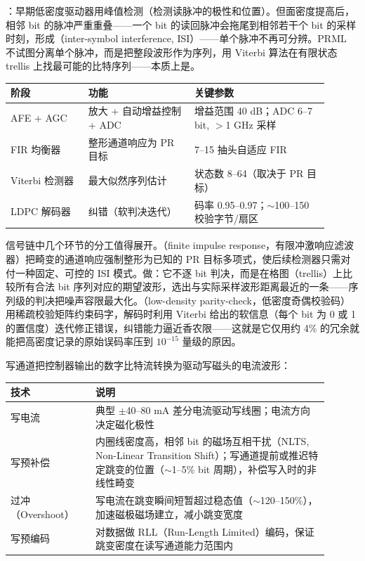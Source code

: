 ：早期低密度驱动器用峰值检测（检测读脉冲的极性和位置）。但面密度提高后，相邻 bit 的脉冲严重重叠——一个 bit 的读回脉冲会拖尾到相邻若干个 bit 的采样时刻，形成（inter-symbol interference, ISI）——单个脉冲不再可分辨。PRML 不试图分离单个脉冲，而是把整段波形作为序列，用 Viterbi 算法在有限状态 trellis 上找最可能的比特序列——本质上是。

\begin{longtable}{L{0.22\linewidth}L{0.3\linewidth}L{0.38\linewidth}}
\toprule
阶段 & 功能 & 关键参数 \\
\midrule
AFE + AGC & 放大 + 自动增益控制 + ADC & 增益范围 40 dB；ADC 6--7 bit, $>$1 GHz 采样 \\
FIR 均衡器 & 整形通道响应为 PR 目标 & 7--15 抽头自适应 FIR \\
Viterbi 检测器 & 最大似然序列估计 & 状态数 8--64（取决于 PR 目标） \\
LDPC 解码器 & 纠错（软判决迭代） & 码率 0.95--0.97；$\sim$100--150 校验字节/扇区 \\
\bottomrule
\end{longtable}

信号链中几个环节的分工值得展开。（finite impulse response，有限冲激响应滤波器）把畸变的通道响应强制整形为已知的 PR 目标多项式，使后续检测器只需对付一种固定、可控的 ISI 模式。做：它不逐 bit 判决，而是在格图（trellis）上比较所有合法 bit 序列对应的期望波形，选出与实际采样波形距离最近的一条——序列级的判决把噪声容限最大化。（low-density parity-check，低密度奇偶校验码）用稀疏校验矩阵约束码字，解码时利用 Viterbi 给出的软信息（每个 bit 为 0 或 1 的置信度）迭代修正错误，纠错能力逼近香农限——这就是它仅用约 4\% 的冗余就能把高密度记录的原始误码率压到 $10^{-15}$ 量级的原因。


写通道把控制器输出的数字比特流转换为驱动写磁头的电流波形：

\begin{longtable}{L{0.24\linewidth}L{0.66\linewidth}}
\toprule
技术 & 说明 \\
\midrule
写电流 & 典型 $\pm$40--80 mA 差分电流驱动写线圈；电流方向决定磁化极性 \\
写预补偿 & 内圈线密度高，相邻 bit 的磁场互相干扰（NLTS, Non-Linear Transition Shift）；写通道提前或推迟特定跳变的位置（$\sim$1--5\% bit 周期），补偿写入时的非线性畸变 \\
过冲（Overshoot） & 写电流在跳变瞬间短暂超过稳态值（$\sim$120--150\%），加速磁极磁场建立，减小跳变宽度 \\
写预编码 & 对数据做 RLL（Run-Length Limited）编码，保证跳变密度在读写通道能力范围内 \\
\bottomrule
\end{longtable}

